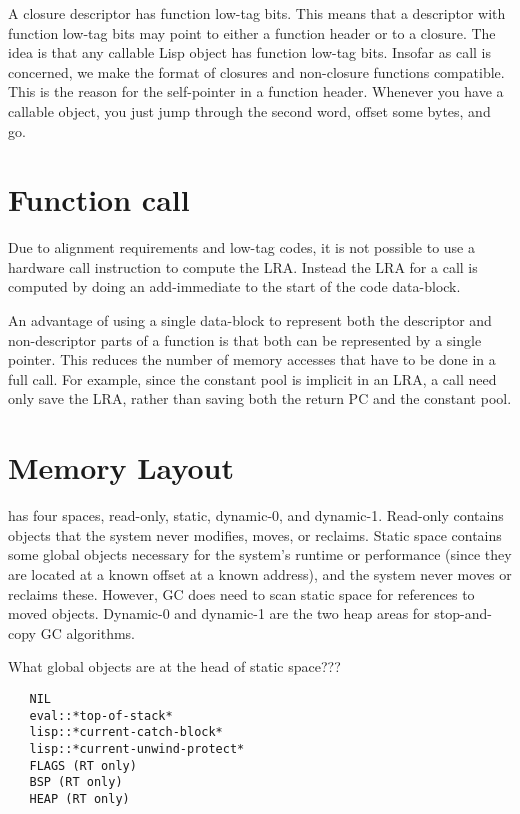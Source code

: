 A closure descriptor has function low-tag bits.  This means that a descriptor
with function low-tag bits may point to either a function header or to a
closure.  The idea is that any callable Lisp object has function low-tag bits.
Insofar as call is concerned, we make the format of closures and non-closure
functions compatible.  This is the reason for the self-pointer in a function
header.  Whenever you have a callable object, you just jump through the second
word, offset some bytes, and go.



\section{Function call}

Due to alignment requirements and low-tag codes, it is not possible to use a
hardware call instruction to compute the LRA.  Instead the LRA
for a call is computed by doing an add-immediate to the start of the code
data-block.

An advantage of using a single data-block to represent both the descriptor and
non-descriptor parts of a function is that both can be represented by a
single pointer.  This reduces the number of memory accesses that have to be
done in a full call.  For example, since the constant pool is implicit in an
LRA, a call need only save the LRA, rather than saving both the
return PC and the constant pool.



\section{Memory Layout}

\cmucl{} has four spaces, read-only, static, dynamic-0, and dynamic-1.
Read-only contains objects that the system never modifies, moves, or reclaims.
Static space contains some global objects necessary for the system's runtime or
performance (since they are located at a known offset at a known address), and
the system never moves or reclaims these.  However, GC does need to scan static
space for references to moved objects.  Dynamic-0 and dynamic-1 are the two
heap areas for stop-and-copy GC algorithms.

What global objects are at the head of static space???
\begin{verbatim}
   NIL
   eval::*top-of-stack*
   lisp::*current-catch-block*
   lisp::*current-unwind-protect*
   FLAGS (RT only)
   BSP (RT only)
   HEAP (RT only)
\end{verbatim}

